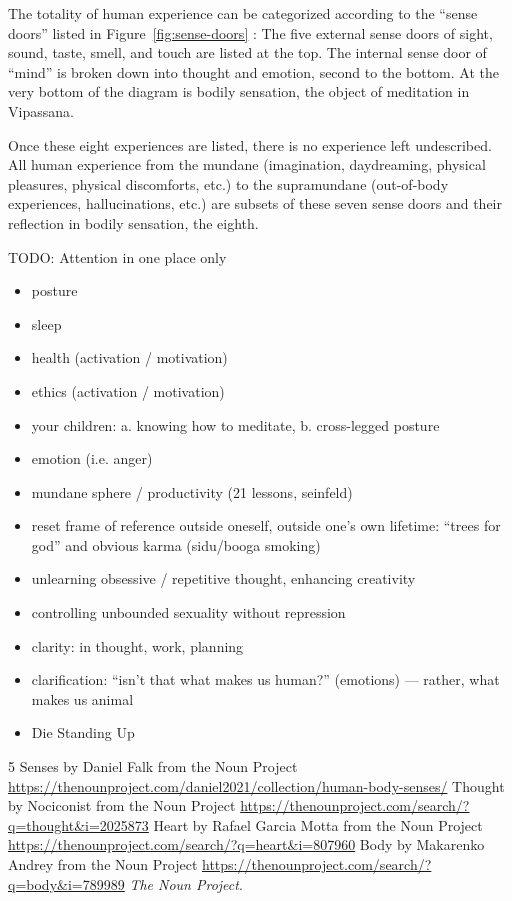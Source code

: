 \documentclass{article}
\begin{document}
The totality of human experience can be categorized according to the ``sense doors''
listed in Figure~\ref{fig:sense-doors} \cite{sense-icons}: The five external sense doors of sight, sound,
taste, smell, and touch are listed at the top. The internal sense door of ``mind'' is
broken down into thought and emotion, second to the bottom. At the very bottom of the
diagram is bodily sensation, the object of meditation in Vipassana.

Once these eight experiences are listed, there is no experience left undescribed. All
human experience from the mundane (imagination, daydreaming, physical pleasures,
physical discomforts, etc.) to the supramundane (out-of-body experiences,
hallucinations, etc.) are subsets of these seven sense doors and their reflection in
bodily sensation, the eighth.

TODO: Attention in one place only



\begin{itemize}
  \item posture
  \item sleep
  \item health (activation / motivation)
  \item ethics (activation / motivation)
  \item your children: a. knowing how to meditate, b. cross-legged posture
  \item emotion (i.e. anger)
  \item mundane sphere / productivity (21 lessons, seinfeld)
  \item reset frame of reference outside oneself, outside one's own lifetime: ``trees for god'' and obvious karma (sidu/booga smoking)
  \item unlearning obsessive / repetitive thought, enhancing creativity
  \item controlling unbounded sexuality without repression
  \item clarity: in thought, work, planning
  \item clarification: ``isn't that what makes us human?'' (emotions) --- rather, what makes us animal
  \item Die Standing Up

\end{itemize}

\pagebreak

\begin{thebibliography}{9}
\raggedright

  5 Senses by Daniel Falk from the Noun Project
  \url{https://thenounproject.com/daniel2021/collection/human-body-senses/}
  Thought by Nociconist from the Noun Project
  \url{https://thenounproject.com/search/?q=thought&i=2025873}
  Heart by Rafael Garcia Motta from the Noun Project
  \url{https://thenounproject.com/search/?q=heart&i=807960}
  Body by Makarenko Andrey from the Noun Project
  \url{https://thenounproject.com/search/?q=body&i=789989}
  \textit{The Noun Project}.

\end{thebibliography}
\end{document}
